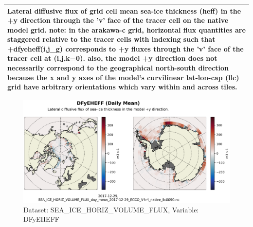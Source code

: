 \begin{longtable}{|m{}|m{}|m{}|m{}|}
\multicolumn{4}{|p{1\textwidth}|}{Lateral diffusive flux of grid cell mean sea-ice thickness (heff) in the +y direction through the 'v' face of the tracer cell on the native model grid. note: in the arakawa-c grid, horizontal flux quantities are staggered relative to the tracer cells with indexing such that +dfyeheff(i,j\_g) corresponds to +y fluxes through the 'v' face of the tracer cell at (i,j,k=0). also, the model +y direction does not necessarily correspond to the geographical north-south direction because the x and y axes of the model's curvilinear lat-lon-cap (llc) grid have arbitrary orientations which vary within and across tiles.} \\ \hline
\end{longtable}

\begin{figure}[H]
\centering
\includegraphics[scale=0.55]{../images/plots/native_plots/Sea-Ice_and_Snow_Horizontal_Volume_Fluxes/DFyEHEFF.png}
\caption{Dataset: SEA\_ICE\_HORIZ\_VOLUME\_FLUX, Variable: DFyEHEFF}
\label{tab:table-SEA_ICE_HORIZ_VOLUME_FLUX_DFyEHEFF-Plot}
\end{figure}
\pagebreak
